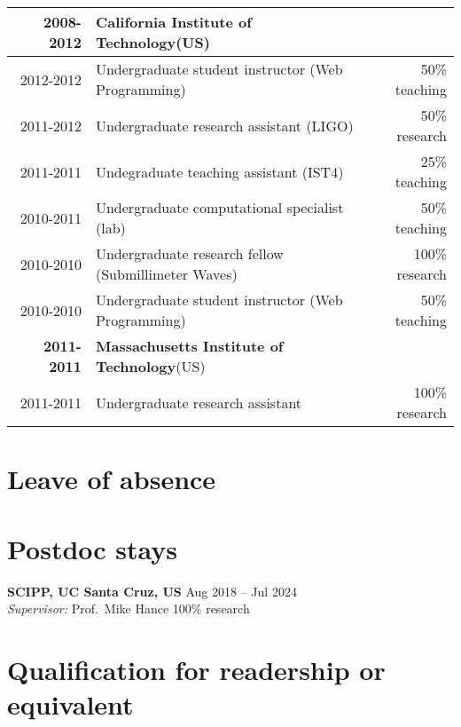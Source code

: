 \begin{table*}[h!]
\begin{tabular}{r|lr}
		\hline\hline
		\normalsize\textbf{2008-2012}    & \textbf{California Institute of Technology}(US)      &                  \\
		\hline
		2012-2012                        & Undergraduate student instructor (Web Programming)   & 50\% teaching    \\
		2011-2012                        & Undergraduate research assistant (LIGO)              & 50\% research    \\
		2011-2011                        & Undegraduate teaching assistant (IST4)               & 25\% teaching    \\
		2010-2011                        & Undergraduate computational specialist (lab)         & 50\% teaching    \\
		2010-2010                        & Undergraduate research fellow (Submillimeter Waves)  & 100\% research   \\
		2010-2010                        & Undergraduate student instructor (Web Programming)   & 50\% teaching    \\
		\hline\hline
		\normalsize\textbf{~2011-2011}   & \textbf{Massachusetts Institute of Technology}(US)   &                  \\
		2011-2011                        & Undergraduate research assistant                     & 100\% research   \\
		\hline
	\end{tabular}
\end{table*}

\vspace{-2.5em}\section{Leave of absence \none}

\vspace{-0.0em}\section{Postdoc stays}
\textbf{SCIPP, UC Santa Cruz, US} \hfill Aug 2018 -- Jul 2024 \\
\textsl{Supervisor:} Prof.~Mike Hance \hfill 100\% research

\vspace{-2.0em}\section{Qualification for readership or equivalent \noneyet}
\, \\

